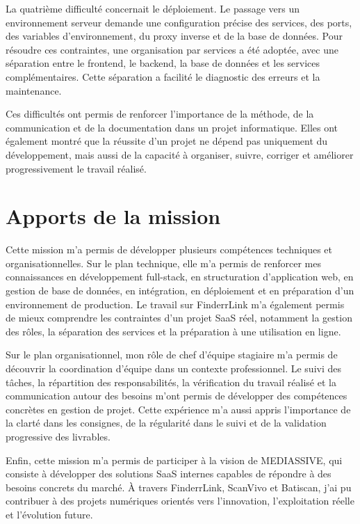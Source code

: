 La quatrième difficulté concernait le déploiement. Le passage vers un environnement serveur demande une configuration précise des services, des ports, des variables d'environnement, du proxy inverse et de la base de données. Pour résoudre ces contraintes, une organisation par services a été adoptée, avec une séparation entre le frontend, le backend, la base de données et les services complémentaires. Cette séparation a facilité le diagnostic des erreurs et la maintenance.

Ces difficultés ont permis de renforcer l'importance de la méthode, de la communication et de la documentation dans un projet informatique. Elles ont également montré que la réussite d'un projet ne dépend pas uniquement du développement, mais aussi de la capacité à organiser, suivre, corriger et améliorer progressivement le travail réalisé.

\section{Apports de la mission}

Cette mission m'a permis de développer plusieurs compétences techniques et organisationnelles. Sur le plan technique, elle m'a permis de renforcer mes connaissances en développement full-stack, en structuration d'application web, en gestion de base de données, en intégration, en déploiement et en préparation d'un environnement de production. Le travail sur FinderrLink m'a également permis de mieux comprendre les contraintes d'un projet SaaS réel, notamment la gestion des rôles, la séparation des services et la préparation à une utilisation en ligne.

Sur le plan organisationnel, mon rôle de chef d'équipe stagiaire m'a permis de découvrir la coordination d'équipe dans un contexte professionnel. Le suivi des tâches, la répartition des responsabilités, la vérification du travail réalisé et la communication autour des besoins m'ont permis de développer des compétences concrètes en gestion de projet. Cette expérience m'a aussi appris l'importance de la clarté dans les consignes, de la régularité dans le suivi et de la validation progressive des livrables.

Enfin, cette mission m'a permis de participer à la vision de MEDIASSIVE, qui consiste à développer des solutions SaaS internes capables de répondre à des besoins concrets du marché. À travers FinderrLink, ScanVivo et Batiscan, j'ai pu contribuer à des projets numériques orientés vers l'innovation, l'exploitation réelle et l'évolution future.

